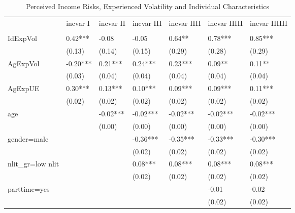 \begin{table}[p]
\centering
\begin{adjustbox}{width=\textwidth}
\begin{threeparttable}
\caption{Perceived Income Risks, Experienced Volatility and Individual Characteristics}
\label{micro_reg}\begin{tabular}{lllllll}
\toprule
{} &  incvar I & incvar II & incvar III & incvar IIII & incvar IIIII & incvar IIIIII \\
                    &           &           &            &             &              &               \\
\midrule
IdExpVol            &   0.42*** &     -0.08 &      -0.05 &      0.64** &      0.78*** &       0.85*** \\
                    &    (0.13) &    (0.14) &     (0.15) &      (0.29) &       (0.28) &        (0.29) \\
AgExpVol            &  -0.20*** &   0.21*** &    0.24*** &     0.23*** &       0.09** &        0.11** \\
                    &    (0.03) &    (0.04) &     (0.04) &      (0.04) &       (0.04) &        (0.04) \\
AgExpUE             &   0.30*** &   0.13*** &    0.10*** &     0.09*** &      0.09*** &       0.11*** \\
                    &    (0.02) &    (0.02) &     (0.02) &      (0.02) &       (0.02) &        (0.02) \\
age                 &           &  -0.02*** &   -0.02*** &    -0.02*** &     -0.02*** &      -0.02*** \\
                    &           &    (0.00) &     (0.00) &      (0.00) &       (0.00) &        (0.00) \\
gender=male         &           &           &   -0.36*** &    -0.35*** &     -0.33*** &      -0.30*** \\
                    &           &           &     (0.02) &      (0.02) &       (0.02) &        (0.02) \\
nlit\_gr=low nlit    &           &           &    0.08*** &     0.08*** &      0.08*** &       0.08*** \\
                    &           &           &     (0.02) &      (0.02) &       (0.02) &        (0.02) \\
parttime=yes        &           &           &            &             &        -0.01 &         -0.02 \\
                    &           &           &            &             &       (0.02) &        (0.02) \\

\end{tabular}
\end{threeparttable}
\end{adjustbox}
\end{table}

